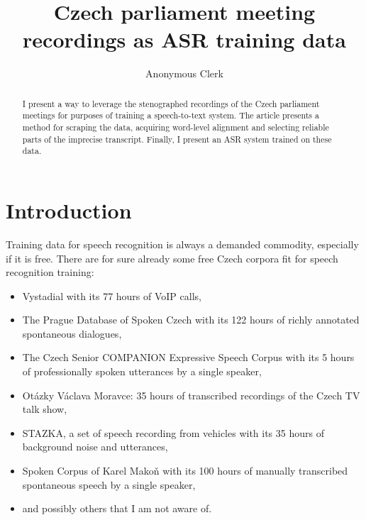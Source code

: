 \documentclass[runningheads]{llncs}
\begin{document}
%
\title{Czech parliament meeting recordings as ASR training data}
%
%
\author{Anonymous Clerk}
%
%
%
\maketitle              %
%
\begin{abstract}
I present a way to leverage the stenographed recordings of the Czech parliament
meetings for purposes of training a speech-to-text system. The article presents
a method for scraping the data, acquiring word-level alignment and selecting
reliable parts of the imprecise transcript. Finally, I present an ASR system
trained on these data.
\end{abstract}

\section{Introduction}
\label{sec:intro}

Training data for speech recognition is always a demanded commodity, especially
if it is free. There are for sure already some free Czech corpora fit for speech
recognition training:
\begin{itemize}
\item{
    Vystadial\cite{vystadialarticle} with its 77 hours of VoIP
    calls\cite{vystadialdata}, 
}
\item{
    The Prague Database of Spoken Czech\cite{pdtscarticle} with its 122 hours
    of richly annotated spontaneous dialogues\cite{pdtscdata},
}
\item{
    The Czech Senior COMPANION Expressive Speech Corpus with its 5 hours
    of professionally spoken utterances by a single speaker\cite{companiondata},
}
\item{
    Otázky Václava Moravce: 35 hours of transcribed recordings of the
    Czech TV talk show\cite{ovmdata},
}
\item{
    STAZKA, a set of speech recording from vehicles with its 35 hours of
    background noise and utterances\cite{stazkadata},
}
\item{
    Spoken Corpus of Karel Makoň\cite{kruuza2012making} with its 100 hours of
    manually transcribed spontaneous speech by a single speaker\cite{makondata},
}
\item{and possibly others that I am not aware of.}
\end{itemize}
\end{document}
